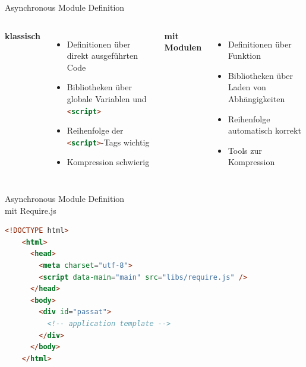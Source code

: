 
\begin{Frame}{Asynchronous Module Definition}
  \begin{columns}
    {\bfseries{}klassisch}
    \begin{itemize}
      \item Definitionen über direkt ausgeführten Code
      \item Bibliotheken über globale Variablen und \lstinline[language=HTML]-<script>-
      \item Reihenfolge der \lstinline[language=HTML]-<script>--Tags wichtig
      \item Kompression schwierig
    \end{itemize}
    {\bfseries{}mit Modulen}
    \begin{itemize}
      \item Definitionen über Funktion
      \item Bibliotheken über Laden von Abhängigkeiten
      \item Reihenfolge automatisch korrekt
      \item Tools zur Kompression
    \end{itemize}
  \end{columns}
\end{Frame}

\begin{Frame}{Asynchronous Module Definition\\ mit Require.js}
  \begin{center}
    
  \end{center}
\end{Frame}

\lstset{basicstyle=\ttfamily\scriptsize}

\begin{Frame}[fragile,t]
  
  \begin{lstlisting}[language=HTML,gobble=4]
    <!DOCTYPE html>
    <html>
      <head>
        <meta charset="utf-8">
        <script data-main="main" src="libs/require.js" />
      </head>
      <body>
        <div id="passat">
          <!-- application template -->
        </div>
      </body>
    </html>
  \end{lstlisting}
\end{Frame}

